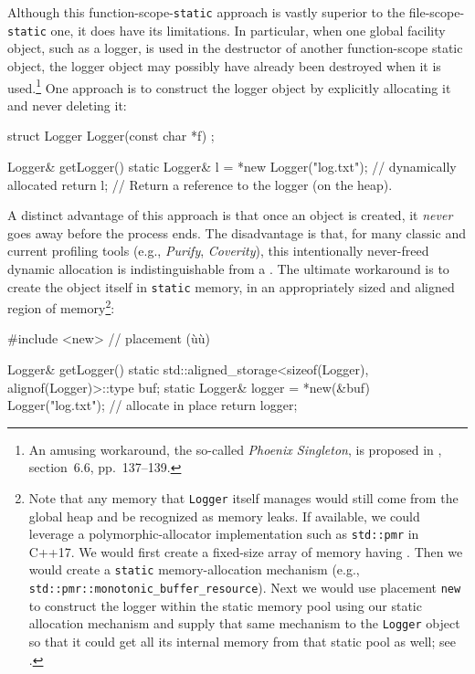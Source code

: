 Although this function-scope-\lstinline!static! approach is vastly superior
to the file-scope-\lstinline!static! one, it does have its limitations. In
particular, when one global facility object, such as a logger, is used
in the destructor of another function-scope static object, the logger
object may possibly have already been destroyed when it is
used.\footnote{An amusing workaround, the so-called \emph{Phoenix
Singleton}, is proposed in \cite{alexandrescu01}, section~6.6, pp.~137--139.} One approach is to construct the logger object by
explicitly allocating it and never deleting it:

\begin{emcppshiddenlisting}[emcppsbatch={e12,e13,e16,e17}]
struct Logger {
  Logger(const char *f) {}
};
\end{emcppshiddenlisting}
\begin{emcppslisting}[emcppsbatch=e12]
Logger& getLogger()
{
    static Logger& l = *new Logger("log.txt");  // dynamically allocated
    return l;  // Return a reference to the logger (on the heap).
}
\end{emcppslisting}

\noindent A distinct advantage of this approach is that once an object is created, it
\emph{never} goes away before the process ends. The disadvantage is
that, for many classic and current profiling tools (e.g., \emph{Purify},
\emph{Coverity}), this intentionally never-freed dynamic allocation is
indistinguishable from a . The ultimate workaround
is to create the object itself in \lstinline!static! memory, in an
appropriately sized and aligned region of memory{\cprotect\footnote{Note
that any memory that \lstinline!Logger! itself manages would still come
from the global heap and be recognized as memory leaks. If available,
we could leverage a polymorphic-allocator implementation such as
\lstinline!std::pmr! in C++17. We would first create a fixed-size array
of memory having . Then we would
create a \lstinline!static! memory-allocation mechanism (e.g.,
\lstinline!std::pmr::monotonic_buffer_resource!). Next we would use
placement \lstinline!new! to construct the logger within the static
memory pool using our static allocation mechanism and supply that same
mechanism to the \lstinline!Logger! object so that it could get all its
  internal memory from that static pool as well; see \cite{lakos22}.}}:

\begin{emcppslisting}[emcppsbatch=e13]
#include <new>  // placement (ù{}ù)

Logger& getLogger()
{
    static std::aligned_storage<sizeof(Logger), alignof(Logger)>::type buf;
    static Logger& logger = *new(&buf) Logger("log.txt");  // allocate in place
    return logger;
}
\end{emcppslisting}

